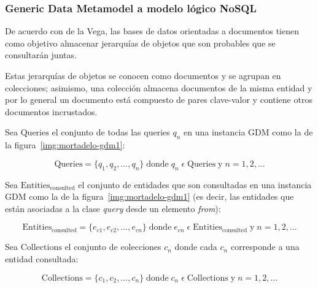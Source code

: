 \subsubsection{Generic Data Metamodel a modelo lógico NoSQL}\label{alg:gdm-to-logic}
De acuerdo con de la Vega\cite{de_la_vega_mortadelo_2020}, las bases de datos orientadas a documentos tienen como objetivo almacenar jerarquías de objetos que son probables que se consultarán juntas.


Estas jerarquías de objetos se conocen como documentos y se agrupan en colecciones; asimismo, una colección almacena documentos de la misma entidad y por lo general un documento está compuesto de pares clave-valor y contiene otros documentos incrustados.



Sea $\mathrm{Queries}$ el conjunto de todas las queries $q_{n}$ en una instancia GDM como la de la figura~\ref{img:mortadelo-gdm1}:

\begin{equation} \label{eq:cap4.3.3.5-00}
    \mathrm{Queries} = \{q_{1}, q_{2},..., q_{n}\}\; \mathrm{donde}\; q_{n}\;\epsilon\;\mathrm{Queries}\; \mathrm{y}\; n=1,2,...
\end{equation}


Sea $\mathrm{Entities_{consulted}}$ el conjunto de entidades que son consultadas en una instancia GDM como la de la figura~\ref{img:mortadelo-gdm1} (es decir, las entidades que están asociadas a la clase \textit{query} desde un elemento \textit{from}): 


\begin{equation} \label{eq:cap4.3.3.5-01}
    \mathrm{Entities_{consulted}} = \{e_{c1},e_{c2},...,e_{cn}\}\; \mathrm{donde}\; e_{cn}\;\epsilon\;\mathrm{Entities_{consulted}}\; \mathrm{y}\; n=1,2,...
\end{equation}

Sea $\mathrm{Collections}$ el conjunto de colecciones $c_{n}$ donde cada $c_{n}$ corresponde a una entidad consultada:

\begin{equation} \label{eq:cap4.3.3.5-02}
    \mathrm{Collections} = \{c_{1},c_{2},...,c_{n}\}\; \mathrm{donde}\; c_{n}\;\epsilon\;\mathrm{Collections}\; \mathrm{y}\; n=1,2,...
\end{equation}




